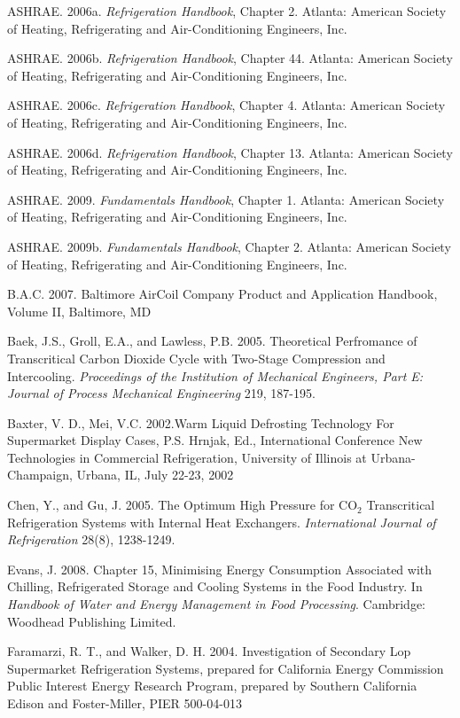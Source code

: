 ASHRAE. 2006a. \emph{Refrigeration Handbook}, Chapter 2. Atlanta: American Society of Heating, Refrigerating and Air-Conditioning Engineers, Inc.

ASHRAE. 2006b. \emph{Refrigeration Handbook}, Chapter 44. Atlanta: American Society of Heating, Refrigerating and Air-Conditioning Engineers, Inc.

ASHRAE. 2006c. \emph{Refrigeration Handbook}, Chapter 4. Atlanta: American Society of Heating, Refrigerating and Air-Conditioning Engineers, Inc.

ASHRAE. 2006d. \emph{Refrigeration Handbook}, Chapter 13. Atlanta: American Society of Heating, Refrigerating and Air-Conditioning Engineers, Inc.

ASHRAE. 2009. \emph{Fundamentals Handbook}, Chapter 1. Atlanta: American Society of Heating, Refrigerating and Air-Conditioning Engineers, Inc.

ASHRAE. 2009b. \emph{Fundamentals Handbook}, Chapter 2. Atlanta: American Society of Heating, Refrigerating and Air-Conditioning Engineers, Inc.

B.A.C. 2007. Baltimore AirCoil Company Product and Application Handbook, Volume II, Baltimore, MD

Baek, J.S., Groll, E.A., and Lawless, P.B. 2005. Theoretical Perfromance of Transcritical Carbon Dioxide Cycle with Two-Stage Compression and Intercooling. \emph{Proceedings of the Institution of Mechanical Engineers, Part E: Journal of Process Mechanical Engineering} 219, 187-195.

Baxter, V. D., Mei, V.C. 2002.Warm Liquid Defrosting Technology For Supermarket Display Cases, P.S. Hrnjak, Ed., International Conference New Technologies in Commercial Refrigeration, University of Illinois at Urbana-Champaign, Urbana, IL, July 22-23, 2002

Chen, Y., and Gu, J. 2005. The Optimum High Pressure for CO\(_{2}\) Transcritical Refrigeration Systems with Internal Heat Exchangers. \emph{International Journal of Refrigeration} 28(8), 1238-1249.

Evans, J. 2008. Chapter 15, Minimising Energy Consumption Associated with Chilling, Refrigerated Storage and Cooling Systems in the Food Industry. In \emph{Handbook of Water and Energy Management in Food Processing}. Cambridge:~ Woodhead Publishing Limited.

Faramarzi, R. T., and Walker, D. H. 2004. Investigation of Secondary Lop Supermarket Refrigeration Systems, prepared for California Energy Commission Public Interest Energy Research Program, prepared by Southern California Edison and Foster-Miller, PIER 500-04-013

